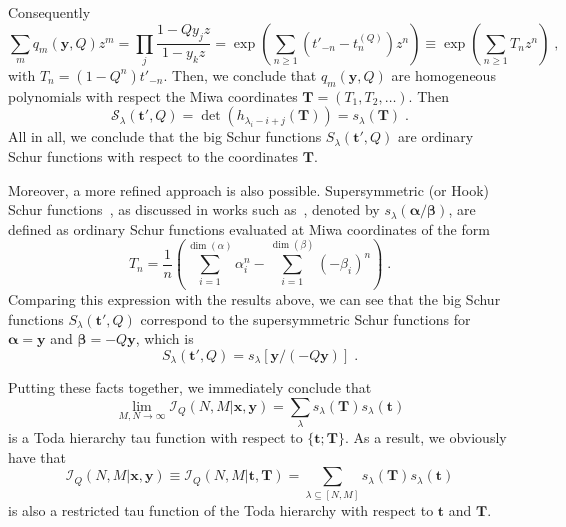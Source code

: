 \documentclass[a4paper,11pt]{amsart}
\begin{document}
Consequently
\begin{equation}
 \sum_{m} q_m(\bm{y}, Q) z^m =
 \prod_j \frac{1 - Q y_j z}{1 - y_k z}
 = \exp \left( \sum_{n\geq 1} (t'_{-n} - t_n^{(Q)})z^n \right)
 \equiv \exp \left( \sum_{n\geq 1} T_n z^n \right)\; ,
\end{equation}
with \(T_n = (1 - Q^n) t'_{-n}\). Then, we conclude that \(q_m(\bm{y}, Q)\)
are homogeneous polynomials with respect the Miwa coordinates
\(\bm{T} = (T_1, T_2, \dots)\). Then
\begin{equation}
  \mathcal{S}_\lambda(\bm{t}', Q) = \det \left(h_{\lambda_i - i +j}(\bm{T})\right) = s_\lambda(\bm{T})\; .
\end{equation}
All in all, we conclude that the big Schur functions
\(S_\lambda(\bm{t}', Q)\) are ordinary Schur functions with respect to
the coordinates \(\bm{T}\).

Moreover, a more refined approach is also possible. Supersymmetric (or
Hook) Schur functions~\cite{Berele:1983}, as discussed in works such
as~\cite{Macdonald:1998, Moens:2003}, denoted by
\(s_\lambda(\bm{\alpha}/\bm{\beta})\), are defined as ordinary Schur
functions evaluated at Miwa coordinates of the form
\begin{equation}
  T_n = \frac{1}{n} \left( \sum_{i=1}^{\dim(\alpha)} \alpha_i^n
       - \sum_{i=1}^{\dim(\beta)} (-\beta_i)^n\right)\; .
\end{equation}
Comparing this expression with the results above, we can see that the
big Schur functions \(S_\lambda(\bm{t}', Q)\) correspond to the
supersymmetric Schur functions for \(\bm{\alpha} = \bm{y}\) and
\(\bm{\beta} = - Q \bm{y}\), which is
\begin{equation}
  S_\lambda(\bm{t}', Q) = s_\lambda[\bm{y}/(- Q\bm{y})]\; .
\end{equation}

Putting these facts together, we immediately conclude that
\begin{equation}
\lim_{M,N\to \infty}\mathcal{I}_Q(N,M|\bm{x}, \bm{y}) = 
  \sum_\lambda s_\lambda(\bm{T}) s_\lambda (\bm{t})
\end{equation}
is a Toda hierarchy tau function with respect to
\(\{\bm{t};\bm{T}\}\). As a result, we obviously have that
\begin{equation}
  \mathcal{I}_Q(N,M| \bm{x}, \bm{y}) \equiv \mathcal{I}_Q(N,M| \bm{t}, \bm{T})
  = \sum_{\lambda \subseteq [N,M]} s_\lambda(\bm{T}) s_\lambda(\bm{t})
\end{equation}
is also a restricted tau function of the Toda hierarchy with respect
to \(\bm{t}\) and \(\bm{T}\).
\end{document}
